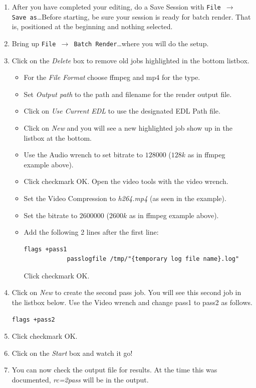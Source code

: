 \begin{enumerate}
	\item After you have completed your editing, do a Save Session with
	\texttt{File $\rightarrow$ Save as}\dots Before starting, be sure
	your session is ready for batch render. That is, positioned at the
	beginning and nothing selected.
	\item Bring up \texttt{File $\rightarrow$ Batch Render}\dots where
	you will do the setup.
	\item Click on the \textit{Delete} box to remove old jobs
	highlighted in the bottom listbox.
	\begin{itemize}
		\item For the \textit{File Format} choose ffmpeg and mp4 for the
		type.
		\item Set \textit{Output path} to the path and filename for the
		render output file.
		\item Click on \textit{Use Current EDL} to use the designated EDL
		Path file.
		\item Click on \textit{New} and you will see a new highlighted job
		show up in the listbox at the bottom.
		\item Use the Audio wrench to set bitrate to $128000$ ($128k$ as
		in ffmpeg example above).
		\item Click checkmark OK\@.  Open the video tools with the video
		wrench.
		\item Set the Video Compression to \textit{h264.mp4} (as seen in
		the example).
		\item Set the bitrate to $2600000$ ($2600k$ as in ffmpeg example
		above).
		\item Add the following 2 lines after the first line:
		\begin{lstlisting}[style=sh]
			flags +pass1
			passlogfile /tmp/"{temporary log file name}.log"
		\end{lstlisting} Click checkmark OK.
	\end{itemize}
	\item Click on \textit{New} to create the second pass job.  You will
	see this second job in the listbox below.  Use the Video wrench and
	change pass1 to pass2 as follows.
	\begin{lstlisting}[style=sh]
		flags +pass2
	\end{lstlisting}
	\item Click checkmark OK.
	\item Click on the \textit{Start} box and watch it go!
	\item You can now check the output file for results.  At the time
	this was documented, \textit{rc=2pass} will be in the output.
\end{enumerate}

